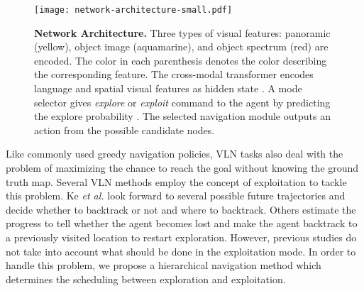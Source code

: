 \documentclass[10pt,twocolumn,letterpaper]{article}
\begin{document}
\begin{figure*}[ht!]{\centering\texttt{[image: network-architecture-small.pdf]}}\centering
\caption{\protect\renewcommand{\baselinestretch}{0.89}\protect\small{\protect\textbf{Network Architecture.} Three types of visual features: panoramic (yellow), object image (aquamarine), and object spectrum (red) are encoded. The color in each parenthesis denotes the color describing the corresponding feature. The cross-modal transformer encodes language and spatial visual features as hidden state . A mode selector gives \textit{explore} or \textit{exploit} command to the agent by predicting the explore probability . The selected navigation module outputs an action  from the possible  candidate nodes.}} \label{fig:network-architecture}\vspace{-0.5cm}
\end{figure*}

Like commonly used greedy navigation policies, VLN tasks also deal with the problem of maximizing the chance to reach the goal without knowing the ground truth map. Several VLN methods employ the concept of exploitation to tackle this problem. Ke \textit{et al.} \cite{ke2019tactical} look forward to several possible future trajectories and decide whether to backtrack or not and where to backtrack. Others \cite{ma2019self, ma2019regretful, zhu2020vision} estimate the progress to tell whether the agent becomes lost and make the agent backtrack to a previously visited location to restart exploration.
 However, previous studies do not take into account what should be done in the exploitation mode. In order to handle this problem, we propose a hierarchical navigation method which determines the scheduling between exploration and exploitation.
 \font=2.5pt
\vspace{-0.2cm}
\end{document}
